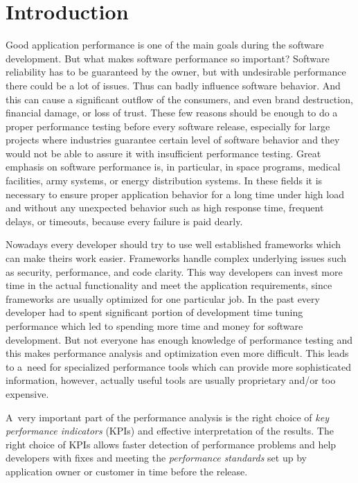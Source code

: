 


\chapter{Introduction}
\label{Introduction}
Good application performance is one of the main goals during the software development. But what makes software performance so important? Software reliability has to be guaranteed by the owner, but with undesirable performance there could be a lot of issues. Thus can badly influence software behavior. And this can cause a significant outflow of the consumers, and even brand destruction, financial damage, or loss of trust. These few reasons should be enough to do a proper performance testing before every software release, especially for large projects where industries guarantee certain level of software behavior and they would not be able to assure it with insufficient performance testing. Great emphasis on software performance is, in particular, in space programs, medical facilities, army systems, or energy distribution systems. In these fields it is necessary to ensure proper application behavior for a long time under high load and without any unexpected behavior such as high response time, frequent delays, or timeouts, because every failure is paid dearly.

Nowadays every developer should try to use well established frameworks which can make theirs work easier. Frameworks handle complex underlying issues such as security, performance, and code clarity. This way developers can invest more time in the actual functionality and meet the application requirements, since frameworks are usually optimized for one particular job. In the past every developer had to spent significant portion of development time tuning performance which led to spending more time and money for software development. But not everyone has enough knowledge of performance testing and this makes performance analysis and optimization even more difficult. This leads to a~need for specialized performance tools which can provide more sophisticated information, however, actually useful tools are usually proprietary and/or too expensive.

A~very important part of the performance analysis is the right choice of \emph{key performance indicators} (KPIs) \cite{Molyneaux:TAoAPT} and effective interpretation of the results. The right choice of KPIs allows faster detection of performance problems and help developers with fixes and meeting the \emph{performance standards} \cite{Molyneaux:TAoAPT} set up by application owner or customer in time before the release.

